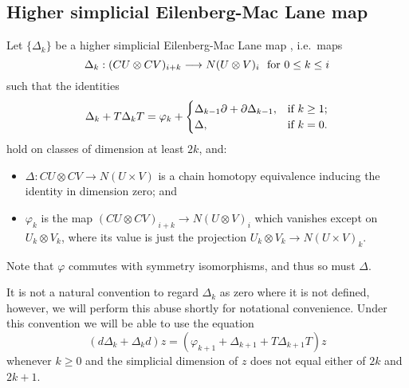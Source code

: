 \documentclass[11pt]{amsart}
\theoremstyle{plain}
\theoremstyle{definition}
\let\phi\varphi
\renewcommand{\to}{\longrightarrow}
\theoremstyle{plain}
\begin{document}
\begin{External spectral sequence operations}
\subsection{Higher simplicial Eilenberg-Mac Lane map}
Let $\{\Delta_k\}$ be a higher simplicial Eilenberg-Mac Lane map \cite[\S3]{DwyerHtpyOpsSimpComAlg.pdf}, i.e.\ maps
\[\Delta_k:(CU\otimes CV)_{i+k}\to N(U\otimes V)_i\textup{\ \ for $0\leq k\leq i$}\]
such that the identities
\[\Delta_k+T\Delta_kT=\phi_k+\begin{cases}
\Delta_{k-1}\partial+\partial\Delta_{k-1},&\textup{if }k\geq1;\\
\Delta,&\textup{if }k=0.
\end{cases}
\]
hold on classes of dimension at least $2k$, and:
\begin{itemize}
\setlength{\parindent}{.25in}
\item $\Delta:CU\otimes CV\to N(U\times V)$ is a chain homotopy equivalence inducing the identity in dimension zero; and
\item $\phi_k$ is the map $(CU\otimes CV)_{i+k}\to N(U\otimes V)_i$ which vanishes except on $U_k\otimes V_k$, where its value is just the projection $U_k\otimes V_k\to N(U\times V)_k$.
\end{itemize}
Note that $\phi$ commutes with symmetry isomorphisms, and thus so must $\Delta$.

It is not a natural convention to regard $\Delta_k$ as zero where it is not defined, however, we will perform this abuse shortly for notational convenience. Under this convention we will be able to use the equation
\[(d\Delta_k+\Delta_kd)z=(\phi_{k+1} +\Delta_{k+1}+T\Delta_{k+1}T)z\]
whenever $k\geq0$ and the simplicial dimension of $z$ does not equal either of $2k$ and $2k+1$.


\end{External spectral sequence operations}
\end{document}

